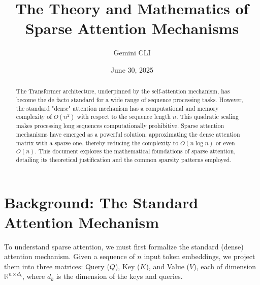 \documentclass{article}
\title{The Theory and Mathematics of Sparse Attention Mechanisms}
\author{Gemini CLI}
\date{June 30, 2025}
\begin{document}
\maketitle

\begin{abstract}
The Transformer architecture, underpinned by the self-attention mechanism, has become the de facto standard for a wide range of sequence processing tasks. However, the standard "dense" attention mechanism has a computational and memory complexity of \(O(n^2)\) with respect to the sequence length \(n\). This quadratic scaling makes processing long sequences computationally prohibitive. Sparse attention mechanisms have emerged as a powerful solution, approximating the dense attention matrix with a sparse one, thereby reducing the complexity to \(O(n \log n)\) or even \(O(n)\). This document explores the mathematical foundations of sparse attention, detailing its theoretical justification and the common sparsity patterns employed.
\end{abstract}

\section{Background: The Standard Attention Mechanism}

To understand sparse attention, we must first formalize the standard (dense) attention mechanism. Given a sequence of \(n\) input token embeddings, we project them into three matrices: Query (\(Q\)), Key (\(K\)), and Value (\(V\)), each of dimension \(\mathbb{R}^{n \times d_k}\), where \(d_k\) is the dimension of the keys and queries.
\end{document}
